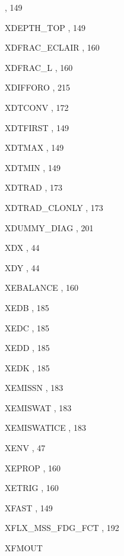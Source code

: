 \begin{theindex}
    \subitem {},  149
  \item XDEPTH\_TOP 
    \subitem {},  149
  \item XDFRAC\_ECLAIR
    \subitem {},  160
  \item XDFRAC\_L
    \subitem {},  160
  \item XDIFFORO
    \subitem {},  215
  \item XDTCONV
    \subitem {},  172
  \item XDTFIRST
    \subitem {},  149
  \item XDTMAX
    \subitem {},  149
  \item XDTMIN
    \subitem {},  149
  \item XDTRAD
    \subitem {},  173
  \item XDTRAD\_CLONLY
    \subitem {},  173
  \item XDUMMY\_DIAG
    \subitem {},  201
  \item XDX
    \subitem {},  44
  \item XDY
    \subitem {},  44
  \item XEBALANCE
    \subitem {},  160
  \item XEDB
    \subitem {},  185
  \item XEDC
    \subitem {},  185
  \item XEDD
    \subitem {},  185
  \item XEDK
    \subitem {},  185
  \item XEMISSN
    \subitem {},  183
  \item XEMISWAT
    \subitem {},  183
  \item XEMISWATICE
    \subitem {},  183
  \item XENV
    \subitem {},  47
  \item XEPROP
    \subitem {},  160
  \item XETRIG
    \subitem {},  160
  \item XFAST
    \subitem {},  149
  \item XFLX\_MSS\_FDG\_FCT
    \subitem {},  192
  \item XFMOUT

\end{theindex}
